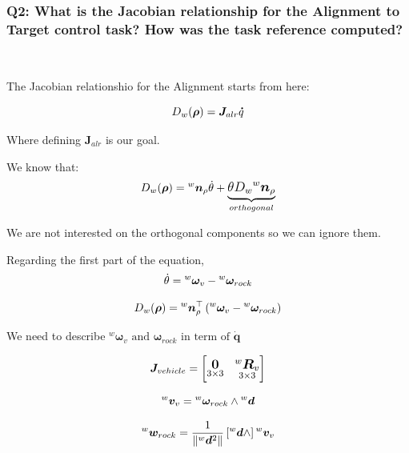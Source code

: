 \documentclass{article}
\begin{document}
\subsubsection{Q2: What is the Jacobian relationship for the Alignment to Target control task? How was the task reference computed?} \

The Jacobian relationshio for the Alignment starts from here:

\begin{equation}
\large
D_{w}(\boldsymbol \rho)=\boldsymbol J_{alr} \boldsymbol \dot{q}
\end{equation}

Where defining $\boldsymbol J_{alr} $ is our goal.

We know that:
\begin{equation}
\large
D_{w}(\boldsymbol \rho)={^w}\boldsymbol n_{\rho} \dot\theta+\underbrace{\theta D_{w} {^w}{\boldsymbol n_{\rho}}}_{orthogonal}
\end{equation}

We are not interested on the orthogonal components so we can ignore them.

Regarding the first part of the equation,
\begin{equation}
\large
\dot{\theta}={^w}\boldsymbol{\omega}_{v} - {^w}{\boldsymbol\omega_{{rock}}}
\end{equation}

\begin{equation}
\large
D_w(\boldsymbol \rho)={^w}\boldsymbol n_\rho^\top \left({^w}{\boldsymbol \omega}_{v}-{^w}{\boldsymbol \omega_{rock}}\right)
\end{equation}

We need to describe ${^w}{\boldsymbol{\omega}}_{v} \text{ and } \boldsymbol{\omega}_{rock} \text{ in term of } \boldsymbol{\dot{q}} $

\begin{equation}
\large
{\boldsymbol J_{vehicle}} = 
    \begin{bmatrix}
     \underset{3\times 3}{\boldsymbol{0}} & \underset{ 3\times 3}{^{w}\boldsymbol{R}_{v}}\\
    \end{bmatrix}
\end{equation}

\begin{equation}
\large
{^w}{\boldsymbol v}_{v}={^w}\boldsymbol \omega_{rock} \wedge {^w} \boldsymbol d
\end{equation}

\begin{equation}
\large
{^w}\boldsymbol w_{rock}=\frac{1}{\left\|{^w} \boldsymbol d^{2}\right\|}\left[{^w}{\boldsymbol d} \wedge\right] {{^w}{\boldsymbol v_{v}}}
\end{equation}
\end{document}
